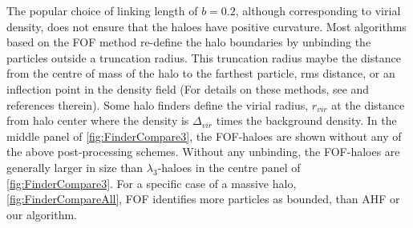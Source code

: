 The popular choice of linking length of $b=0.2$, although corresponding to virial density, does not ensure that the haloes have positive curvature. Most algorithms based on the FOF method re-define the halo boundaries by unbinding the particles outside a truncation radius. This truncation radius maybe the distance from the centre of mass of the halo to the farthest particle, rms distance, or an inflection point in the density field (For details on these methods, see \citealt{Knebe2011a} and references therein). Some halo finders define the virial radius, $r_{vir}$ at the distance from halo center where the density is $\Delta_{vir}$ times the background density. In the middle panel of \autoref{fig:FinderCompare3}, the FOF-haloes are shown without any of the above post-processing schemes. Without any unbinding, the FOF-haloes are generally larger in size than $\lambda_3$-haloes in the centre panel of \autoref{fig:FinderCompare3}. For a specific case of a massive halo, \autoref{fig:FinderCompareAll}, FOF identifies more particles as bounded, than AHF or our algorithm.  

